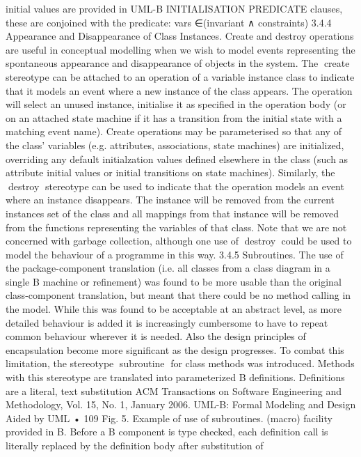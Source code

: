 initial values are provided in UML-B INITIALISATION PREDICATE clauses, these are
conjoined with the predicate:
vars ∈(invariant ∧ constraints)
3.4.4 Appearance and Disappearance of Class Instances. Create and destroy operations are useful in conceptual modelling when we wish to model
events representing the spontaneous appearance and disappearance of objects
in the system. The create stereotype can be attached to an operation of a
variable instance class to indicate that it models an event where a new instance
of the class appears. The operation will select an unused instance, initialise it
as specified in the operation body (or on an attached state machine if it has a
transition from the initial state with a matching event name). Create operations may be parameterised so that any of the class’ variables (e.g. attributes,
associations, state machines) are initialized, overriding any default initialzation values defined elsewhere in the class (such as attribute initial values or
initial transitions on state machines). Similarly, the destroy stereotype can
be used to indicate that the operation models an event where an instance disappears. The instance will be removed from the current instances set of the
class and all mappings from that instance will be removed from the functions
representing the variables of that class. Note that we are not concerned with
garbage collection, although one use of destroy could be used to model the
behaviour of a programme in this way.
3.4.5 Subroutines. The use of the package-component translation (i.e. all
classes from a class diagram in a single B machine or refinement) was found
to be more usable than the original class-component translation, but meant
that there could be no method calling in the model. While this was found to
be acceptable at an abstract level, as more detailed behaviour is added it is
increasingly cumbersome to have to repeat common behaviour wherever it is
needed. Also the design principles of encapsulation become more significant as
the design progresses. To combat this limitation, the stereotype subroutine
for class methods was introduced. Methods with this stereotype are translated
into parameterized B definitions. Definitions are a literal, text substitution
ACM Transactions on Software Engineering and Methodology, Vol. 15, No. 1, January 2006.
UML-B: Formal Modeling and Design Aided by UML • 109
Fig. 5. Example of use of subroutines.
(macro) facility provided in B. Before a B component is type checked, each
definition call is literally replaced by the definition body after substitution of
